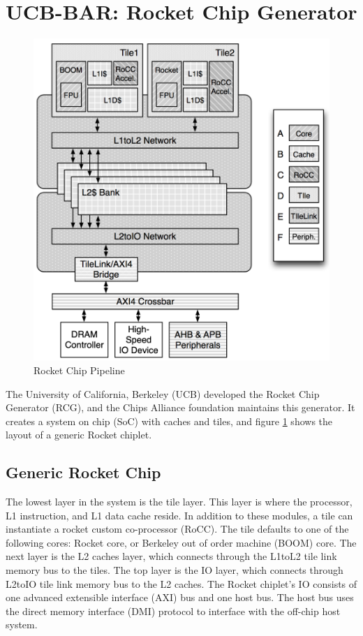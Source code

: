 \documentclass[../main.tex]{subfiles}
\begin{document}
\section{UCB-BAR: Rocket Chip Generator}
\label{sec:RCG}
\begin{figure}
    \centering
    \includegraphics[scale=.35]{pngs/RocketChipGeneratorLayout.png}
    \caption{Rocket Chip Pipeline\cite{Asanović:EECS-2016-17}}
    \label{fig:RocketCipGen}
\end{figure}

The University of California, Berkeley (UCB) developed the Rocket Chip Generator (RCG), and the Chips Alliance foundation maintains this generator. It creates a system on chip (SoC) with caches and tiles, and figure \ref{fig:RocketCipGen} shows the layout of a generic Rocket chiplet. 

\subsection{Generic Rocket Chip}
The lowest layer in the system is the tile layer. This layer is where the processor,  L1 instruction, and L1 data cache reside. In addition to these modules, a tile can instantiate a rocket custom co-processor (RoCC).  The tile defaults to one of the following cores: Rocket core, or Berkeley out of order machine (BOOM) core.  The next layer is the L2 caches layer, which connects through the L1toL2 tile link memory bus to the tiles. The top layer is the IO layer, which connects through L2toIO tile link memory bus to the L2 caches. The Rocket chiplet's IO consists of one advanced extensible interface (AXI) bus and one host bus. The host bus uses the direct memory interface (DMI) protocol to interface with the off-chip host system. 
\end{document}
